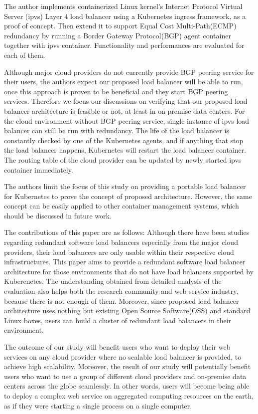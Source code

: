 The author implements containerized Linux kernel's Internet Protocol Virtual Server (ipvs)\cite{Zhang2000} Layer 4 load balancer using a Kubernetes ingress\cite{K8sIngress2017} framework, as a proof of concept.
Then extend it to support Equal Cost Multi-Path(ECMP)\cite{thaler2000multipath} redundancy by running a Border Gateway Protocol(BGP) agent container together with ipvs container.
Functionality and performances are evaluated for each of them.

Although major cloud providers do not currently provide BGP peering service for their users, the authors expect our proposed load balancer will be able to run, once this approach is proven to be beneficial and they start BGP peering services.
Therefore we focus our discussions on verifying that our proposed load balancer architecture is feasible or not, at least in on-premise data centers.
For the cloud environment without BGP peering service, single instance of ipvs load balancer can still be run with redundancy.
The life of the load balancer is constantly checked by one of the Kubernetes agents, and if anything that stop the load balancer happens, Kubernetes will restart the load balancer container.
The routing table of the cloud provider can be updated by newly started ipvs container immediately.

The authors limit the focus of this study on providing a portable load balancer for Kubernetes to prove the concept of proposed architecture.
However, the same concept can be easily applied to other container management systems, which should be discussed in future work.

The contributions of this paper are as follows:
Although there have been studies regarding redundant software load balancers especially from the major cloud providers\cite{eisenbud2016maglev,patel2013ananta}, their load balancers are only usable within their respective cloud infrastructures.
This paper aims to provide a redundant software load balancer architecture for those environments that do not have load balancers supported by Kuberenetes.
The understanding obtained from detailed analysis of the evaluation also helps both the research community and web service industry, because there is not enough of them.
Moreover, since proposed load balancer architecture uses nothing but existing Open Source Software(OSS) and standard Linux boxes, users can build a cluster of redundant load balancers in their environment.

The outcome of our study will benefit users who want to deploy their web services on any cloud provider where no scalable load balancer is provided, to achieve high scalability.
Moreover, the result of our study will potentially benefit users who want to use a group of different cloud providers and on-premise data centers across the globe seamlessly.
In other words, users will become being able to deploy a complex web service on aggregated computing resources on the earth, as if they were starting a single process on a single computer.


